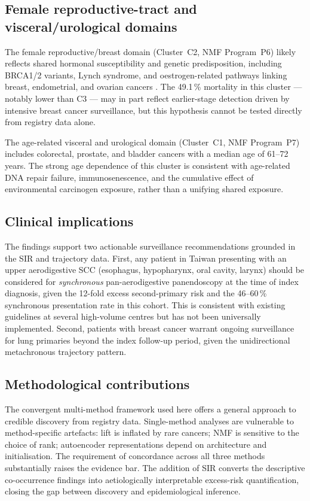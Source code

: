\documentclass[review,12pt]{elsarticle}
\begin{document}
\subsection{Female reproductive-tract and visceral/urological domains}
The female reproductive/breast domain (Cluster~C2, NMF Program~P6) likely
reflects shared hormonal susceptibility and genetic predisposition, including
BRCA1/2 variants, Lynch syndrome, and oestrogen-related pathways linking breast,
endometrial, and ovarian cancers \cite{Vogt2017}. The 49.1\,\% mortality in
this cluster --- notably lower than C3 --- may in part reflect earlier-stage
detection driven by intensive breast cancer surveillance, but this hypothesis
cannot be tested directly from registry data alone.

The age-related visceral and urological domain (Cluster~C1, NMF Program~P7)
includes colorectal, prostate, and bladder cancers with a median age of 61--72
years. The strong age dependence of this cluster is consistent with
age-related DNA repair failure, immunosenescence, and the cumulative effect of
environmental carcinogen exposure, rather than a unifying shared exposure.

\subsection{Clinical implications}
The findings support two actionable surveillance recommendations grounded in the
SIR and trajectory data. First, any patient in Taiwan presenting with an
upper aerodigestive SCC (esophagus, hypopharynx, oral cavity, larynx) should be
considered for \textit{synchronous} pan-aerodigestive panendoscopy at the time of
index diagnosis, given the 12-fold excess second-primary risk and the 46--60\,\%
synchronous presentation rate in this cohort. This is consistent with existing
guidelines at several high-volume centres but has not been universally
implemented. Second, patients with breast cancer warrant ongoing surveillance
for lung primaries beyond the index follow-up period, given the unidirectional
metachronous trajectory pattern.

\subsection{Methodological contributions}
The convergent multi-method framework used here offers a general approach to
credible discovery from registry data. Single-method analyses are vulnerable to
method-specific artefacts: lift is inflated by rare cancers; NMF is sensitive to
the choice of rank; autoencoder representations depend on architecture and
initialisation. The requirement of concordance across all three methods
substantially raises the evidence bar. The addition of SIR converts the
descriptive co-occurrence findings into aetiologically interpretable excess-risk
quantification, closing the gap between discovery and epidemiological inference.
\end{document}
